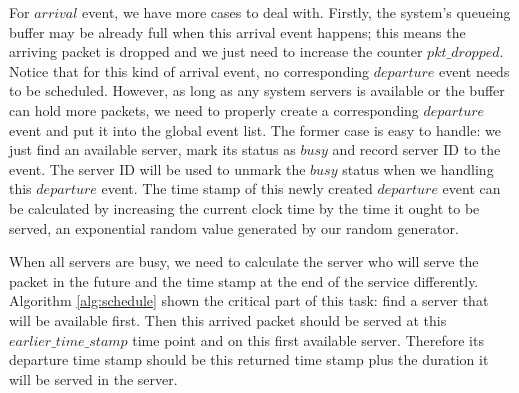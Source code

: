 \documentclass[12pt]{article}  %
\theoremstyle{definition}
\theoremstyle{remark}
\begin{document}
For $arrival$ event, we have more cases to deal with.
Firstly, the system's queueing buffer may be already full when this arrival event happens;
this means the arriving packet is dropped and we just need to increase the counter $pkt\_dropped$. Notice that for this kind of arrival event, no corresponding $departure$ event needs to be scheduled.
However, as long as any system servers is available or the buffer can hold more packets, we need to properly create a corresponding $departure$ event and put it into the global event list.
The former case is easy to handle: we just find an available server, mark its status as $busy$ and record server ID to the event. 
The server ID will be used to unmark the $busy$ status when we handling this $departure$ event.
The time stamp of this newly created $departure$ event can be calculated by increasing the current clock time by the time it ought to be served, an exponential random value generated by our random generator.

When all servers are busy, we need to calculate the server who will serve the packet in the future and the time stamp at the end of the service differently.
Algorithm \ref{alg:schedule} shown the critical part of this task: find a server that will be available first.
Then this arrived packet should be served at this $earlier\_time\_stamp$ time point and on this first available server.
Therefore its departure time stamp should be this returned time stamp plus the duration it will be served in the server.
\end{document}
